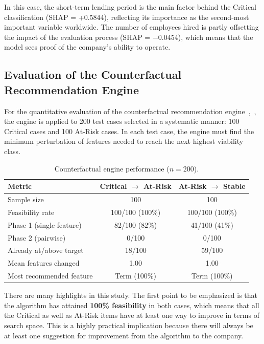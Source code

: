 In this case, the short-term lending period is the main factor behind the Critical classification (SHAP = +0.5844), reflecting its importance as the second-most important variable worldwide. The number of employees hired is partly offsetting the impact of the evaluation process (SHAP = $-$0.0454), which means that the model sees proof of the company's ability to operate.

\subsection{Evaluation of the Counterfactual Recommendation Engine}

For the quantitative evaluation of the counterfactual recommendation engine~\cite{20},~\cite{21}, the engine is applied to 200 test cases selected in a systematic manner: 100 Critical cases and 100 At-Risk cases. In each test case, the engine must find the minimum perturbation of features needed to reach the next highest viability class.

\begin{table}[htbp]
\centering
\caption{Counterfactual engine performance ($n = 200$).}
\label{tab:cf_eval}
\begin{tabular}{lcc}
\hline
\textbf{Metric} & \textbf{Critical $\rightarrow$ At-Risk} & \textbf{At-Risk $\rightarrow$ Stable} \\
\hline
Sample size & 100 & 100 \\
Feasibility rate & 100/100 (100\%) & 100/100 (100\%) \\
Phase 1 (single-feature) & 82/100 (82\%) & 41/100 (41\%) \\
Phase 2 (pairwise) & 0/100 & 0/100 \\
Already at/above target & 18/100 & 59/100 \\
Mean features changed & 1.00 & 1.00 \\
Most recommended feature & Term (100\%) & Term (100\%) \\
\hline
\end{tabular}
\end{table}

There are many highlights in this study. The first point to be emphasized is that the algorithm has attained \textbf{100\% feasibility} in both cases, which means that all the Critical as well as At-Risk items have at least one way to improve in terms of search space. This is a highly practical implication because there will always be at least one suggestion for improvement from the algorithm to the company.


